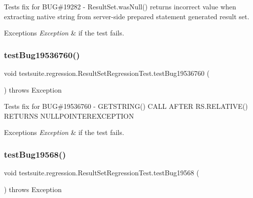 Tests fix for B\+UG\#19282 -\/ Result\+Set.\+was\+Null() returns incorrect value when extracting native string from server-\/side prepared statement generated result set.


\begin{DoxyExceptions}{Exceptions}
{\em Exception} & if the test fails. \\
\hline
\end{DoxyExceptions}
\mbox{\label{classtestsuite_1_1regression_1_1_result_set_regression_test_a84aedc11c7b191cccc83a821ad7b3927}} 
\subsubsection{\texorpdfstring{test\+Bug19536760()}{testBug19536760()}}
{\footnotesize\ttfamily void testsuite.\+regression.\+Result\+Set\+Regression\+Test.\+test\+Bug19536760 (\begin{DoxyParamCaption}{ }\end{DoxyParamCaption}) throws Exception}

Tests fix for B\+UG\#19536760 -\/ G\+E\+T\+S\+T\+R\+I\+N\+G() C\+A\+LL A\+F\+T\+ER R\+S.\+R\+E\+L\+A\+T\+I\+V\+E() R\+E\+T\+U\+R\+NS N\+U\+L\+L\+P\+O\+I\+N\+T\+E\+R\+E\+X\+C\+E\+P\+T\+I\+ON


\begin{DoxyExceptions}{Exceptions}
{\em Exception} & if the test fails. \\
\hline
\end{DoxyExceptions}
\mbox{\label{classtestsuite_1_1regression_1_1_result_set_regression_test_a243245419ea16f2581deffc7fd1bf796}} 
\subsubsection{\texorpdfstring{test\+Bug19568()}{testBug19568()}}
{\footnotesize\ttfamily void testsuite.\+regression.\+Result\+Set\+Regression\+Test.\+test\+Bug19568 (\begin{DoxyParamCaption}{ }\end{DoxyParamCaption}) throws Exception}

